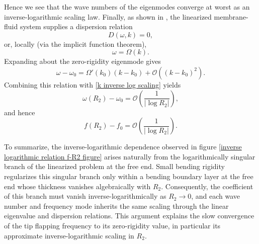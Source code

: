 \documentclass{article}[12pt]
\theoremstyle{Theorem}
\begin{document}
Hence we see that the wave numbers of the eigenmodes converge at worst as an inverse-logarithmic scaling law. Finally, as shown in \cite{alben2022dynamics}, the linearized membrane-fluid system supplies a dispersion relation
\begin{equation}
    D(\omega,k)=0,
\end{equation}
or, locally (via the implicit function theorem),
\begin{equation}
    \omega=\Omega(k).
\end{equation}
Expanding about the zero-rigidity eigenmode gives
\begin{equation}
    \omega-\omega_0
    =
    \Omega'(k_0)(k-k_0)
    +
    \mathcal{O}\left((k-k_0)^2\right).
\end{equation}
Combining this relation with \eqref{k inverse log scaling} yields
\begin{equation}
    \omega(R_2)-\omega_0
    =
    \mathcal{O}\left(\frac{1}{|\log R_2|}\right),
\end{equation}
and hence
\begin{equation}
    f(R_2)-f_0
    =
    \mathcal{O}\left(\frac{1}{|\log R_2|}\right).
    \label{frequency inverse log scaling}
\end{equation}

To summarize, the inverse-logarithmic dependence observed in figure
\ref{inverse logarithmic relation f-R2 figure} arises naturally from the logarithmically singular branch of the linearized problem at the free end. Small bending rigidity regularizes this singular branch only within a bending boundary layer at the free end whose thickness vanishes algebraically with $R_2$. Consequently, the coefficient of this branch must vanish inverse-logarithmically as $R_2\rightarrow 0$, and each wave number and frequency mode inherits the same scaling through the linear eigenvalue and dispersion relations. This argument explains the slow convergence of the tip flapping frequency to its zero-rigidity value, in particular its approximate inverse-logarithmic scaling in $R_2$.
\newline
\end{document}
